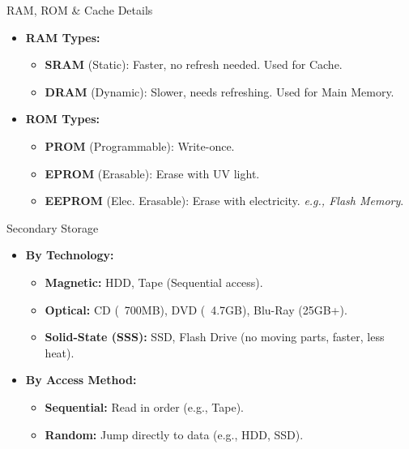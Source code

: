 \documentclass[a4paper, 8pt]{extarticle}
\newcommand{\subsectionheading}[1]{%
  \par\vspace{0.3em}\nopagebreak
  {\headingfont\fontsize{9pt}{10pt}\selectfont\color{black!80}#1}\par\nopagebreak\vspace{-0.3em}
}
\begin{document}
\begin{multicols}{2}
\subsectionheading{RAM, ROM \& Cache Details}
\begin{itemize}
    \item \textbf{RAM Types:}
        \begin{itemize}
            \item \textbf{SRAM} (Static): Faster, no refresh needed. Used for Cache.
            \item \textbf{DRAM} (Dynamic): Slower, needs refreshing. Used for Main Memory.
        \end{itemize}
    \item \textbf{ROM Types:}
        \begin{itemize}
            \item \textbf{PROM} (Programmable): Write-once.
            \item \textbf{EPROM} (Erasable): Erase with UV light.
            \item \textbf{EEPROM} (Elec. Erasable): Erase with electricity. \textit{e.g., Flash Memory}.
        \end{itemize}
\end{itemize}
\subsectionheading{Secondary Storage}
\begin{itemize}
    \item \textbf{By Technology:}
        \begin{itemize}
            \item \textbf{Magnetic:} HDD, Tape (Sequential access).
            \item \textbf{Optical:} CD (~700MB), DVD (~4.7GB), Blu-Ray (25GB+).
            \item \textbf{Solid-State (SSS):} SSD, Flash Drive (no moving parts, faster, less heat).
        \end{itemize}
    \item \textbf{By Access Method:}
        \begin{itemize}
            \item \textbf{Sequential:} Read in order (e.g., Tape).
            \item \textbf{Random:} Jump directly to data (e.g., HDD, SSD).
        \end{itemize}
\end{itemize}

\end{multicols}
\end{document}
